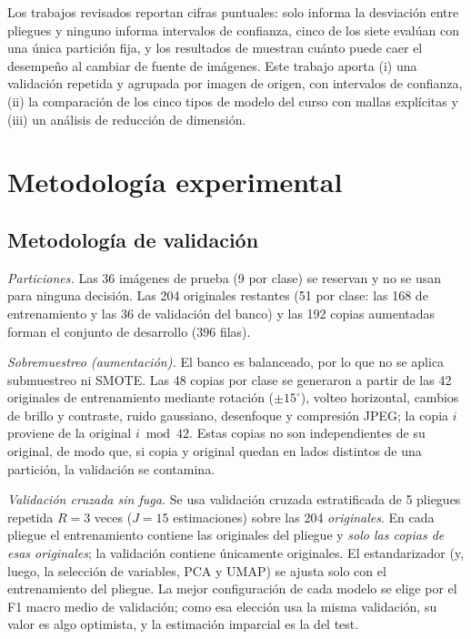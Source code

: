 \documentclass[journal]{IEEEtran}
\begin{document}
Los trabajos revisados reportan cifras puntuales: solo \cite{zhang2019} informa la desviación entre pliegues y ninguno informa intervalos de confianza, cinco de los siete evalúan con una única partición fija, y los resultados de \cite{long2025} muestran cuánto puede caer el desempeño al cambiar de fuente de imágenes. Este trabajo aporta (i) una validación repetida y agrupada por imagen de origen, con intervalos de confianza, (ii) la comparación de los cinco tipos de modelo del curso con mallas explícitas y (iii) un análisis de reducción de dimensión.

\section{Metodología experimental}
\subsection{Metodología de validación}\label{sec:val}
\emph{Particiones.} Las 36 imágenes de prueba (9 por clase) se reservan y no se usan para ninguna decisión. Las 204 originales restantes (51 por clase: las 168 de entrenamiento y las 36 de validación del banco) y las 192 copias aumentadas forman el conjunto de desarrollo ($396$ filas).

\emph{Sobremuestreo (aumentación).} El banco es balanceado, por lo que no se aplica submuestreo ni SMOTE. Las 48 copias por clase se generaron a partir de las 42 originales de entrenamiento mediante rotación ($\pm15^\circ$), volteo horizontal, cambios de brillo y contraste, ruido gaussiano, desenfoque y compresión JPEG; la copia $i$ proviene de la original $i \bmod 42$. Estas copias no son independientes de su original, de modo que, si copia y original quedan en lados distintos de una partición, la validación se contamina.

\emph{Validación cruzada sin fuga.} Se usa validación cruzada estratificada de 5 pliegues repetida $R=3$ veces ($J=15$ estimaciones) sobre las 204 \emph{originales}. En cada pliegue el entrenamiento contiene las originales del pliegue y \emph{solo las copias de esas originales}; la validación contiene únicamente originales. El estandarizador (y, luego, la selección de variables, PCA y UMAP) se ajusta solo con el entrenamiento del pliegue. La mejor configuración de cada modelo se elige por el F1 macro medio de validación; como esa elección usa la misma validación, su valor es algo optimista, y la estimación imparcial es la del test.
\end{document}
